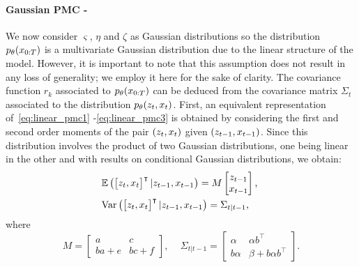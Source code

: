 \paragraph{Gaussian PMC -}
We now consider $\varsigma$, $\eta$ and $\zeta$ as Gaussian distributions so
the distribution $p_{\theta}(x_{0:T})$ is a multivariate Gaussian distribution due to
the linear structure of the model. However, it is important to note that this
assumption does not result in any loss of generality; we employ it here for the
sake of clarity.
The covariance function $r_k$ associated
to $p_{\theta}(x_{0:T})$ can be deduced from the covariance matrix 
$\Sigma_t$ associated to the distribution $p_{\theta}(z_t,x_t)$.
First, an equivalent representation of~\eqref{eq:linear_pmc1}
-\eqref{eq:linear_pmc3}
is obtained by considering the first and second
 order moments of the pair $(z_t,x_t)$ given $(z_{t-1},x_{t-1})$. 
Since this distribution involves the product of two Gaussian 
distributions, one being linear
in the other and with results on
conditional Gaussian distributions, we obtain:
\begin{align*}
    &{\mathbb{E}}\left( \begin{bmatrix} z_t ,  x_t \end{bmatrix}^\intercal | z_{t-1},x_{t-1}  \right)= 
    M \begin{bmatrix} z_{t-1} \\ x_{t-1} \end{bmatrix} \text{, }\\
    &\mathrm{Var}\left( \begin{bmatrix} z_t , x_t \end{bmatrix}^\intercal | z_{t-1},x_{t-1}  \right)= \Sigma_{t|t-1} \text{,}
\end{align*}
where
\begin{equation}
    \label{eq:trans-var-pmc}
    M= \begin{bmatrix} a & c \\ ba+e & bc+f \end{bmatrix} \text{, } \quad \Sigma_{t|t-1} = \begin{bmatrix} \alpha & \alpha b^\intercal \\ b\alpha & \beta+ b\alpha b^\intercal \end{bmatrix} \text{.}
\end{equation}

